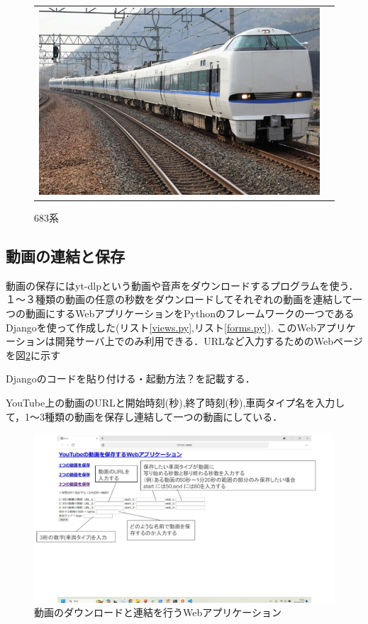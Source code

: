 \begin{figure}[htbp]
\begin{tabular}{cc}
\begin{minipage}[b]{0.15\textwidth}
			\includegraphics[width=\linewidth]{densya/683.jpg}
			\caption{683系}
			\label{fig:6833}
		\end{minipage}
	\end{tabular}
\end{figure}


\subsection{動画の連結と保存}
動画の保存にはyt-dlpという動画や音声をダウンロードするプログラムを使う．
１〜３種類の動画の任意の秒数をダウンロードしてそれぞれの動画を連結して一つの動画にするWebアプリケーションをPythonのフレームワークの一つであるDjangoを使って作成した(リスト\ref{views.py},リスト\ref{forms.py}).
このWebアプリケーションは開発サーバ上でのみ利用できる．URLなど入力するためのWebページを図\ref{downloadApp}に示す

Djangoのコードを貼り付ける・起動方法？を記載する．

YouTube上の動画のURLと開始時刻(秒),終了時刻(秒),車両タイプ名を入力して，1〜3種類の動画を保存し連結して一つの動画にしている．
	
\begin{figure}[H]
	\includegraphics [width=0.9\linewidth]{chap3/fig/django.pdf}
	\caption{動画のダウンロードと連結を行うWebアプリケーション}
	\label{downloadApp}
\end{figure}

